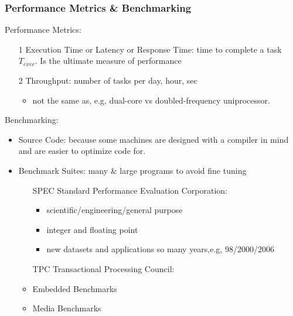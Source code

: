 \documentclass{beamer}
\newcommand{\emp}[1]{\textcolor{DikuRed}{ #1}}
\begin{document}
\begin{frame}[fragile,t]
\frametitle{Performance Metrics \& Benchmarking}

Performance Metrics:
\begin{itemize}
    \item[1] \emp{Execution Time or Latency or Response Time}: 
            time to complete a task $T_{exec}$.
            Is the ultimate measure of performance\medskip

    \item[2] \emp{Throughput}: number of tasks per day, hour, sec
        \begin{itemize}
            \item not the same as, e.g, dual-core vs doubled-frequency uniprocessor.
        \end  {itemize}\medskip
\end{itemize}

Benchmarking:\smallskip
\begin{itemize}
    \item Source Code: because some machines are designed with
            a compiler in mind and are easier to optimize code for.\smallskip

    \item Benchmark Suites: many \& large programs to avoid fine tuning
        \begin{itemize}
            \item[SPEC] Standard Performance Evaluation Corporation:
                \begin{itemize}
                    \item scientific/engineering/general purpose
                    \item integer and floating point
                    \item new datasets and applications so 
                            many years,e.g, 98/2000/2006
                \end  {itemize}
            \item[TPC] Transactional Processing Council:
            \item Embedded Benchmarks
            \item Media Benchmarks
        \end  {itemize}
\end  {itemize}
\end{frame}
\end{document}
